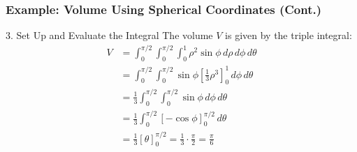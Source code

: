 \documentclass[aspectratio=169, UTF8]{beamer}
\begin{document}
\begin{frame}
\frametitle{Example: Volume Using Spherical Coordinates (Cont.)}

\begin{block}{3. Set Up and Evaluate the Integral}
    The volume $V$ is given by the triple integral:
    \begin{align*}
        V &= \int_{0}^{\pi/2} \int_{0}^{\pi/2} \int_{0}^{1} \rho^2 \sin\phi \, d\rho \, d\phi \, d\theta \\
          &= \int_{0}^{\pi/2} \int_{0}^{\pi/2} \sin\phi \left[ \frac{1}{3}\rho^3 \right]_{0}^{1} \, d\phi \, d\theta \\
          &= \frac{1}{3} \int_{0}^{\pi/2} \int_{0}^{\pi/2} \sin\phi \, d\phi \, d\theta \\
          &= \frac{1}{3} \int_{0}^{\pi/2} [-\cos\phi]_{0}^{\pi/2} \, d\theta \\
          &= \frac{1}{3} [\theta]_{0}^{\pi/2} = \frac{1}{3} \cdot \frac{\pi}{2} = \frac{\pi}{6}
    \end{align*}
\end{block}

\end{frame}

\end{document}
